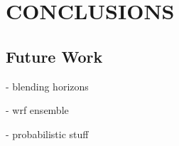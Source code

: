 \chapter{CONCLUSIONS}
\label{chap:conc}

\section{Future Work}

- blending horizons

- wrf ensemble

- probabilistic stuff


